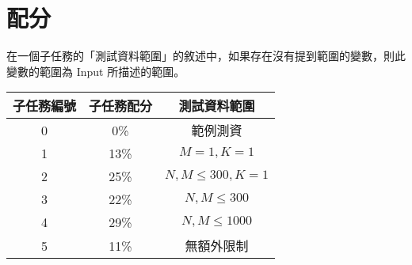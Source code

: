 \documentclass[11pt,a4paper]{article}
\begin{document}
\section*{配分}

在一個子任務的「測試資料範圍」的敘述中，如果存在沒有提到範圍的變數，則此變數的範圍為 Input 所描述的範圍。

\begin{center}
 \begin{tabular}{||c c c||} 
 \hline
 子任務編號 & 子任務配分 & 測試資料範圍 \\  
 \hline
 \hline
 0 & 0\% & 範例測資 \\ 
 \hline
 1 & 13\% & $M =  1 , K = 1 $ \\
 \hline 
 2 & 25\% & $N, M \le  300, K = 1$ \\
 \hline
 3 & 22\% & $N, M \le  300$ \\
 \hline
 4 & 29\% & $N, M \le 1000$ \\
 \hline
 5 & 11\% & 無額外限制 \\
 \hline
\end{tabular}
\end{center}
\end{document}
